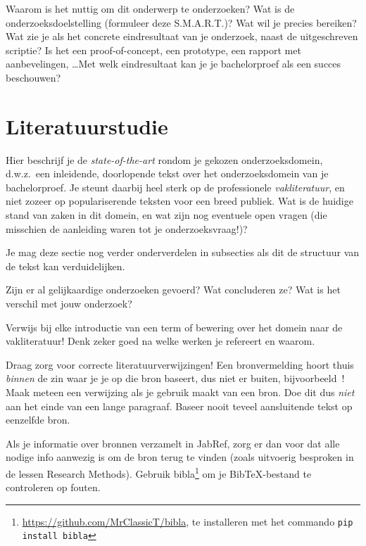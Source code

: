 \documentclass{hogent-article}
\begin{document}
Waarom is het nuttig om dit onderwerp te onderzoeken? Wat is de onderzoeksdoelstelling (formuleer deze S.M.A.R.T.)? Wat wil je precies bereiken? Wat zie je als het concrete eindresultaat van je onderzoek, naast de uitgeschreven scriptie? Is het een proof-of-concept, een prototype, een rapport met aanbevelingen, \ldots Met welk eindresultaat kan je je bachelorproef als een succes beschouwen?

\section{Literatuurstudie}%
\label{sec:literatuurstudie}


Hier beschrijf je de \emph{state-of-the-art} rondom je gekozen onderzoeksdomein, d.w.z.\ een inleidende, doorlopende tekst over het onderzoeksdomein van je bachelorproef. Je steunt daarbij heel sterk op de professionele \emph{vakliteratuur}, en niet zozeer op populariserende teksten voor een breed publiek. Wat is de huidige stand van zaken in dit domein, en wat zijn nog eventuele open vragen (die misschien de aanleiding waren tot je onderzoeksvraag!)? 

Je mag deze sectie nog verder onderverdelen in subsecties als dit de structuur van de tekst kan verduidelijken.

Zijn er al gelijkaardige onderzoeken gevoerd? Wat concluderen ze? Wat is het verschil met jouw onderzoek?

Verwijs bij elke introductie van een term of bewering over het domein naar de vakliteratuur! Denk zeker goed na welke werken je refereert en waarom.

Draag zorg voor correcte literatuurverwijzingen! Een bronvermelding hoort thuis \emph{binnen} de zin waar je je op die bron baseert, dus niet er buiten, bijvoorbeeld~\autocite{Hykes2013}! Maak meteen een verwijzing als je gebruik maakt van een bron. Doe dit dus \emph{niet} aan het einde van een lange paragraaf. Baseer nooit teveel aansluitende tekst op eenzelfde bron.

Als je informatie over bronnen verzamelt in JabRef, zorg er dan voor dat alle nodige info aanwezig is om de bron terug te vinden (zoals uitvoerig besproken in de lessen Research Methods). Gebruik bibla\footnote{\url{https://github.com/MrClassicT/bibla}, te installeren met het commando \texttt{pip install bibla}} om je Bib\TeX-be\-stand te controleren op fouten.

\end{document}
